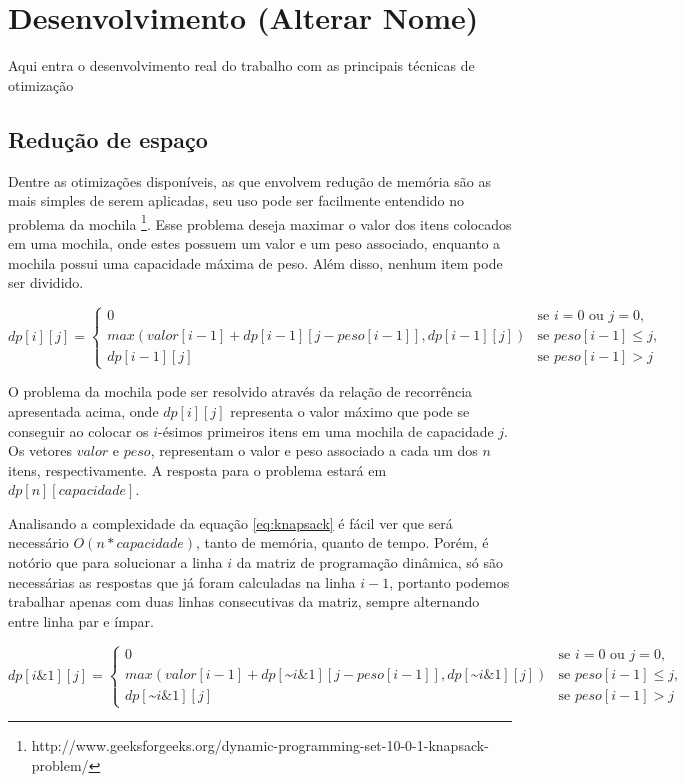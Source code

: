 \chapter{Desenvolvimento (Alterar Nome) }
\label{chap:desenvolvimento}

Aqui entra o desenvolvimento real do trabalho com as principais técnicas de otimização

\section{Redução de espaço}
Dentre as otimizações disponíveis, as que envolvem redução de memória são as mais simples de serem aplicadas, seu uso pode ser facilmente entendido no problema da mochila \footnote{http://www.geeksforgeeks.org/dynamic-programming-set-10-0-1-knapsack-problem/}. Esse problema deseja maximar o valor dos itens colocados em uma mochila, onde estes possuem um valor e um peso associado, enquanto a mochila possui uma capacidade máxima de peso. Além disso, nenhum item pode ser dividido.  

\begin{equation}
dp[i][j] = 
\begin{cases}
0 &\text{se } i = 0 \text{ ou } j = 0,\\
max(valor[i-1] + dp[i-1][j-peso[i-1]], dp[i-1][j]) &\text{se } peso[i-1] \leq{j},\\
dp[i-1][j] &\text{se } peso[i-1] > j
\end{cases}
\label{eq:knapsack}
\end{equation}

O problema da mochila pode ser resolvido através da relação de recorrência apresentada acima, onde $dp[i][j]$ representa o valor máximo que pode se conseguir ao colocar os $i$-ésimos primeiros itens em uma mochila de capacidade $j$. Os vetores $valor$ e $peso$, representam o valor e peso associado a cada um dos $n$ itens, respectivamente. A resposta para o problema estará em $dp[n][capacidade]$.

Analisando a complexidade da equação \ref{eq:knapsack} é fácil ver que será necessário $O(n*capacidade)$, tanto de memória, quanto de tempo. Porém, é notório que para solucionar a linha $i$ da matriz de programação dinâmica, só são necessárias as respostas que já foram calculadas na linha $i - 1$, portanto podemos trabalhar apenas com duas linhas consecutivas da matriz, sempre alternando entre linha par e ímpar. 

\begin{equation}
dp[i\&1][j] = 
\begin{cases}
0 &\text{se } i = 0 \text{ ou } j = 0,\\

max(valor[i-1] + dp[\text{\textasciitilde}i\&1][j-peso[i-1]], dp[\text{\textasciitilde}i\&1][j]) &\text{se } peso[i-1] \leq{j},\\
dp[\text{\textasciitilde}i\&1][j] &\text{se } peso[i-1] > j
\end{cases}
\label{eq:knapsackmemorialinear}
\end{equation}

